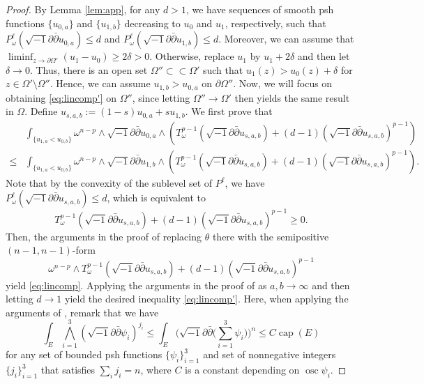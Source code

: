 \documentclass{amsart}
\numberwithin{equation}{section}
\theoremstyle{plain}
\theoremstyle{definition}
\theoremstyle{remark}
\newcommand{\delb}{\sqrt{-1}\partial\bar{\partial}}
\begin{document}
\begin{proof}
    By Lemma \ref{lem:app}, for any $d>1$, we have sequences of smooth psh functions $\{u_{0,a}\}$ and $\{u_{1,b}\}$ decreasing to $u_0$ and $u_1$, respectively, such that $P^{\ell}_\omega(\delb u_{0,a})\le d$ and $P^{\ell}_\omega(\delb u_{1,b})\le d$. Moreover, we can assume that $\liminf_{z\to\partial\Omega'}(u_1-u_0)\ge 2\delta>0$. Otherwise, replace $u_1$ by $u_1+2\delta$ and then let $\delta\to0$. Thus, there is an open set $\Omega''\subset\subset\Omega'$ such that $u_1(z)>u_0(z)+\delta$ for $z\in\Omega'\setminus\Omega''$. Hence, we can assume $u_{1,b}>u_{0,a}$ on $\partial\Omega''$. Now, we will focus on obtaining \eqref{eq:lincomp'} on $\Omega''$, since letting $\Omega''\to\Omega'$ then yields the same result in $\Omega$.
    Define $u_{s,a,b}:=(1-s)u_{0,a}+su_{1,b}$. 
    We first prove that 
    \begin{equation}\label{eq:lincomp}
        \begin{aligned}
            &\int_{\{u_{1,a}<u_{0,b}\}}\omega^{n-p}\wedge\delb u_{0,a}\wedge \left(T^{p-1}_{\omega}(\delb u_{s,a,b})+(d-1)(\delb u_{s,a,b})^{p-1}\right)\\
            \le&\int_{\{u_{1,a}<u_{0,b}\}}\omega^{n-p}\wedge\delb u_{1,b}\wedge \left(T^{p-1}_{\omega}(\delb u_{s,a,b})+(d-1)(\delb u_{s,a,b})^{p-1}\right).
        \end{aligned}
    \end{equation}
    Note that by the convexity of the sublevel set of $P^{\ell}$, we have $P^\ell_\omega(\delb u_{s,a,b})\le d$, which is equivalent to 
    $$T^{p-1}_\omega(\delb u_{s,a,b})+(d-1)(\delb u_{s,a,b})^{p-1}\ge0.$$ 
    Then, the arguments in the proof of \cite[Proposition 3.1]{BT'} replacing $\theta$ there with the semipositive $(n-1,n-1)$-form
    $$\omega^{n-p}\wedge T^{p-1}_\omega(\delb u_{s,a,b})+(d-1)(\delb u_{s,a,b})^{p-1}$$
    yield \eqref{eq:lincomp}. Applying the arguments in the proof of \cite[Theorem 4.1]{BT} as $a,b\to\infty$ and then letting $d\to1$ yield the desired inequality \eqref{eq:lincomp'}. Here, when applying the arguments of \cite[Theorem 4.1]{BT}, remark that we have
    $$\int_E \bigwedge_{i=1}^3(\delb\psi_i)^{j_i}\le \int_E \Big(\delb \Big(\sum_{i=1}^3\psi_i\Big)\Big)^n\le C \operatorname{cap}(E)$$
    for any set of bounded psh functions $\{\psi_i\}_{i=1}^3$ and set of nonnegative integers $\{j_i\}_{i=1}^3$ that satisfies $\sum_ij_i=n$,
    where $C$ is a constant depending on $\operatorname{osc}\psi_i$.
\end{proof}
\end{document}
